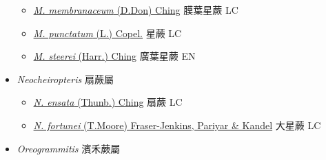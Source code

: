 \begin{itemize}
  \begin{itemize}
        \item[] \href{http://www.theplantlist.org/tpl1.1/search?q=Microsorum+membranaceum}{\textit{M. membranaceum} (D.Don) Ching}   膜葉星蕨   LC
        \item[] \href{http://www.theplantlist.org/tpl1.1/search?q=Microsorum+punctatum}{\textit{M. punctatum} (L.) Copel.}   星蕨   LC
        \item[] \href{http://www.theplantlist.org/tpl1.1/search?q=Microsorum+steerei}{\textit{M. steerei} (Harr.) Ching}   廣葉星蕨   EN
  \end{itemize}
 \item[    ] \textit{Neocheiropteris} 扇蕨屬
                                
  \begin{itemize}
        \item[] \href{http://www.theplantlist.org/tpl1.1/search?q=Neocheiropteris+ensata}{\textit{N. ensata} (Thunb.) Ching}   扇蕨   LC
        \item[] \href{http://www.theplantlist.org/tpl1.1/search?q=Neocheiropteris+fortunei}{\textit{N. fortunei} (T.Moore) Fraser-Jenkins, Pariyar \& Kandel}   大星蕨   LC
  \end{itemize}
 \item[    ] \textit{Oreogrammitis} 濱禾蕨屬
                                

\end{itemize}
